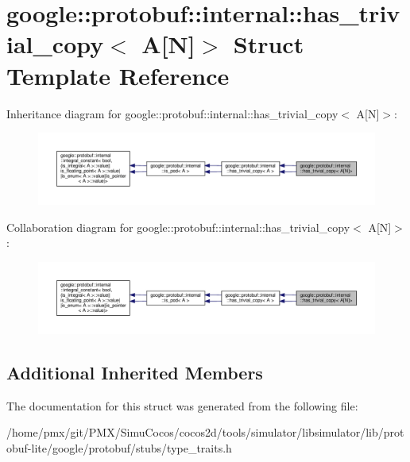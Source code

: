 \hypertarget{structgoogle_1_1protobuf_1_1internal_1_1has__trivial__copy_3_01A[N]_4}{}\section{google\+:\+:protobuf\+:\+:internal\+:\+:has\+\_\+trivial\+\_\+copy$<$ A\mbox{[}N\mbox{]}$>$ Struct Template Reference}
\label{structgoogle_1_1protobuf_1_1internal_1_1has__trivial__copy_3_01A[N]_4}


Inheritance diagram for google\+:\+:protobuf\+:\+:internal\+:\+:has\+\_\+trivial\+\_\+copy$<$ A\mbox{[}N\mbox{]}$>$\+:
\nopagebreak
\begin{figure}[H]
\begin{center}
\leavevmode
\includegraphics[width=350pt]{structgoogle_1_1protobuf_1_1internal_1_1has__trivial__copy_3_01A[N]_4__inherit__graph}
\end{center}
\end{figure}


Collaboration diagram for google\+:\+:protobuf\+:\+:internal\+:\+:has\+\_\+trivial\+\_\+copy$<$ A\mbox{[}N\mbox{]}$>$\+:
\nopagebreak
\begin{figure}[H]
\begin{center}
\leavevmode
\includegraphics[width=350pt]{structgoogle_1_1protobuf_1_1internal_1_1has__trivial__copy_3_01A[N]_4__coll__graph}
\end{center}
\end{figure}
\subsection*{Additional Inherited Members}


The documentation for this struct was generated from the following file\+:\begin{DoxyCompactItemize}
\item 
/home/pmx/git/\+P\+M\+X/\+Simu\+Cocos/cocos2d/tools/simulator/libsimulator/lib/protobuf-\/lite/google/protobuf/stubs/type\+\_\+traits.\+h\end{DoxyCompactItemize}
